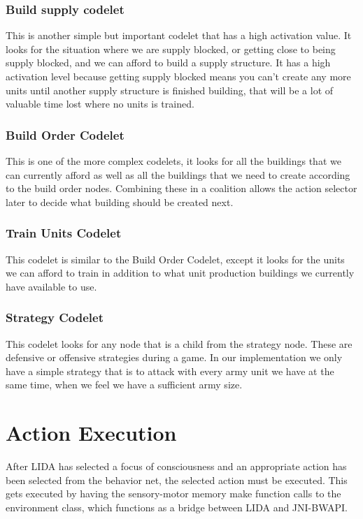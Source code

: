 \subsubsection{Build supply codelet}
This is another simple but important codelet that has a high activation value. It looks for the situation where we are supply blocked, or getting close to being supply blocked, and we can afford to build a supply structure. It has a high activation level because getting supply blocked means you can't create any more units until another supply structure is finished building, that will be a lot of valuable time lost where no units is trained.

\subsubsection{Build Order Codelet}
This is one of the more complex codelets, it looks for all the buildings that we can currently afford as well as all the buildings that we need to create according to the build order nodes. Combining these in a coalition allows the action selector later to decide what building should be created next.

\subsubsection{Train Units Codelet}
This codelet is similar to the Build Order Codelet, except it looks for the units we can afford to train in addition to what unit production buildings we currently have available to use.

\subsubsection{Strategy Codelet}
This codelet looks for any node that is a child from the strategy node. These are defensive or offensive strategies during a game. In our implementation we only have a simple strategy that is to attack with every army unit we have at the same time, when we feel we have a sufficient army size.

\section{Action Execution}
\label{sec:actionexecution}
After LIDA has selected a focus of consciousness and an appropriate action has been selected from the behavior net, the selected action must be executed. This gets executed by having the sensory-motor memory make function calls to the environment class, which functions as a bridge between LIDA and JNI-BWAPI.

